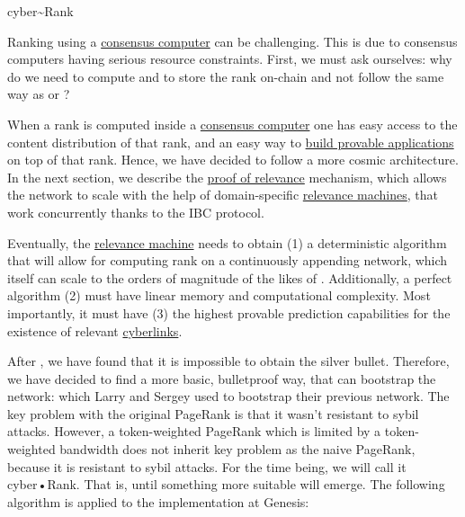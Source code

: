 \documentclass[8pt,oneside]{amsart}
\makeatletter
\newcommand{\linkred}[2]{\href{#1}{\color{red}{#2}}}
\newcommand{\linkgreen}[2]{\href{#1}{\color{green}{#2}}}
\renewcommand\subsection{\@startsection{subsection}
                                    {2}{\z@}
                                    {-3.25ex\@plus -1ex \@minus -.2ex}
                                    {0ex \@plus .2ex}
                                    {\play\Large}
                        }
\newcommand{\titleSection}[1]{\subsection{#1}}
\makeatother
\begin{document}
\titleSection{cyber\~{}Rank}\label{cyber-rank}

Ranking using a {\hyperref[consensus-computer]{consensus computer}} can be challenging. This is due to consensus computers having serious resource constraints. First, we must ask ourselves: why do we need to compute and to store the rank on-chain and not follow the same way as \linkgreen{https://ipfs.io/ipfs/QmZo7eY5UdJYotf3Z9GNVBGLjkCnE1j2fMdW2PgGCmvGPj}{Colony} or \linkgreen{https://ipfs.io/ipfs/QmTrxXp2xhB2zWGxhNoLgsztevqKLwpy5HwKjLjzFa7rnD}{Truebit}?

When a rank is computed inside a {\hyperref[consensus-computer]{consensus computer}} one has easy access to the content distribution of that rank, and an easy way to {\hyperref[apps]{build provable applications}} on top of that rank. Hence, we have decided to follow a more cosmic architecture. In the next section, we describe the {\hyperref[proof-of-relevance]{proof of relevance}} mechanism, which allows the network to scale with the help of domain-specific {\hyperref[relevance-machine]{relevance machines}}, that work concurrently thanks to the IBC protocol.

Eventually, the {\hyperref[relevance-machine]{relevance machine}} needs to obtain (1) a deterministic algorithm that will allow for computing rank on a continuously appending network, which itself can scale to the orders of magnitude of the likes of \linkred{https://google.com}{Google}. Additionally, a perfect algorithm (2) must have linear memory and computational complexity. Most importantly, it must have (3) the highest provable prediction capabilities for the existence of relevant {\hyperref[cyberlinks]{cyberlinks}}.

After \linkgreen{https://ipfs.io/ipfs/QmTJPJ55ePgR2MS1HoAtyqS1mteVLXUjAS4H8W97EEopxC}{some research}, we have found that it is impossible to obtain the silver bullet. Therefore, we have decided to find a more basic, bulletproof way, that can bootstrap the network: \linkgreen{http://ipfs.io/ipfs/QmbuE2Pfcsiji1g9kzmmsCnptqPEn3BuN3BhnZHrPVsiVw}{the rank} which Larry and Sergey used to bootstrap their previous network. The key problem with the original PageRank is that it wasn't resistant to sybil attacks. However, a token-weighted PageRank which is limited by a token-weighted bandwidth does not inherit key problem as the naive PageRank, because it is resistant to sybil attacks. For the time being, we will call it cyber•Rank. That is, until something more suitable will emerge. The following algorithm is applied to the implementation at Genesis:
\end{document}

